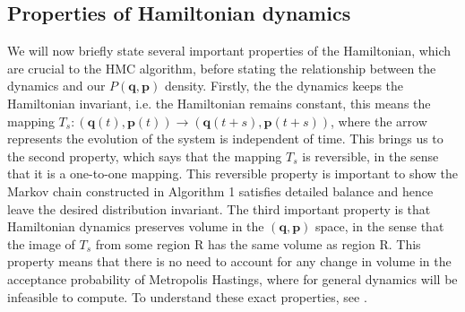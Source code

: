 \documentclass[11pt]{article}
\begin{document}
\subsection{Properties of Hamiltonian dynamics}
We will now briefly state several important properties of the Hamiltonian, which are crucial to the HMC algorithm, before stating the relationship between the dynamics and our $P(\mathbf{q},\mathbf{p})$ density. Firstly, the the dynamics keeps the Hamiltonian invariant, i.e. the Hamiltonian remains constant, this means the mapping $T_s: (\mathbf{q}(t),\mathbf{p}(t)) \rightarrow (\mathbf{q}(t+s),\mathbf{p}(t+s))$, where the arrow represents the evolution of the system is independent of time. This brings us to the second property, which says that the mapping $T_s$ is reversible, in the sense that it is a one-to-one mapping. This reversible property is important to show the Markov chain constructed in Algorithm 1 satisfies detailed balance and hence leave the desired distribution invariant. The third important property is that Hamiltonian dynamics preserves volume in the $(\mathbf{q},\mathbf{p})$ space, in the sense that the image of $T_s$ from some region R has the same volume as region R. This property means that there is no need to account for any change in volume in the acceptance probability of Metropolis Hastings, where for general dynamics will be infeasible to compute. To understand these exact properties, see \cite{neal}.
\end{document}
